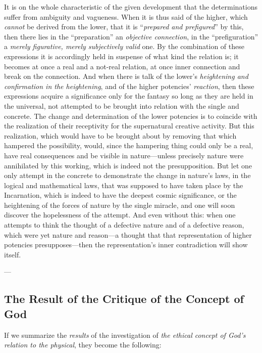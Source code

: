 \documentclass[12pt,a4paper]{book}
\begin{document}
It is on the whole characteristic of the given development that the determinations suffer
from ambiguity and vagueness. When it is thus said of the higher, which \emph{cannot} be derived
from the lower, that it is ``\emph{prepared and prefigured}'' by this, then there lies in the
``preparation'' an \emph{objective connection}, in the ``prefiguration'' a \emph{merely
figurative, merely subjectively valid} one. By the combination of these expressions it is
accordingly held in suspense of what kind the relation is; it becomes at once a real and a
not-real relation, at once inner connection and break on the connection. And when there is
talk of the lower's \emph{heightening and confirmation in the heightening}, and of the
higher potencies' \emph{reaction}, then these expressions acquire a significance only for the
fantasy so long as they are held in the universal, not attempted to be brought into
relation with the single and concrete. The change and determination of the lower potencies
is to coincide with the realization of their receptivity for the supernatural creative
activity. But this realization, which would have to be brought about by removing that which
hampered the possibility, would, since the hampering thing could only be a real, have real
consequences and be visible in nature---unless precisely nature were annihilated by this
working, which is indeed not the presupposition. But let one only attempt in the concrete to
demonstrate the change in nature's laws, in the logical and mathematical laws, that was
supposed to have taken place by the Incarnation, which is indeed to have the deepest cosmic
significance, or the heightening of the forces of nature by the single miracle, and one will
soon discover the hopelessness of the attempt. And even without this: when one attempts to
think the thought of a defective nature and of a defective reason, which were yet nature and
reason---a thought that that representation of higher potencies presupposes---then the
representation's inner contradiction will show itself.

\begin{center}---\end{center}

\subsection{The Result of the Critique of the Concept of God}
\label{ssec:god-result}

If we summarize the \emph{results} of the investigation of \emph{the ethical concept of God's
relation to the physical}, they become the following:
\end{document}
